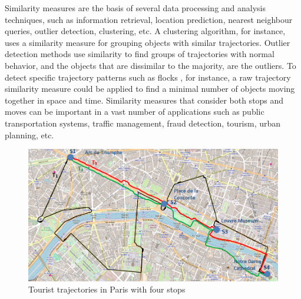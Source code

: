  

Similarity measures are the basis of several data processing and analysis techniques, such as information retrieval, location prediction, nearest neighbour queries, outlier detection, clustering, etc. A clustering algorithm, for instance, uses a similarity measure for grouping objects with similar trajectories. Outlier detection methods use similarity to find groups of trajectories with normal behavior, and the objects that are dissimilar to the majority, are the outliers. To detect specific trajectory patterns such as flocks \cite{Laube2005}, for instance, a raw trajectory similarity measure could be applied to find a minimal number of objects moving together in space and time. Similarity measures that consider both stops and moves can be important in a vast number of applications such as public transportation systems, traffic management, fraud detection, tourism, urban planning, etc.

\begin{figure}[h]
\centering
\includegraphics[width=1.0\textwidth]{Images/paris5.png}
\caption{Tourist trajectories in Paris with four stops}
\end{figure}
\label{fig:Paris}


